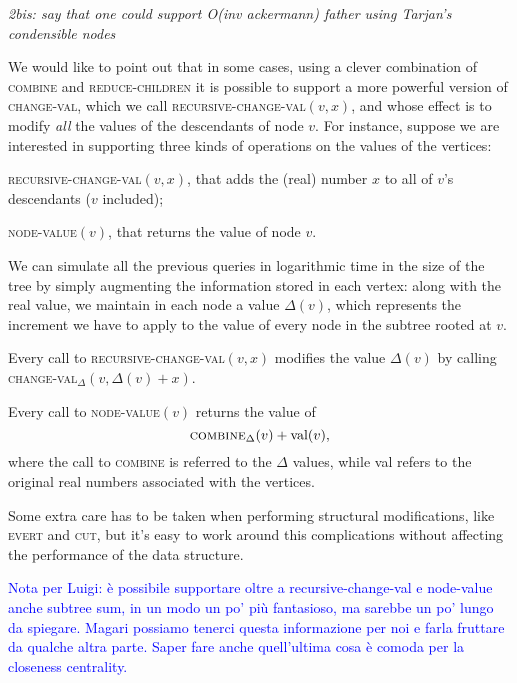 \documentclass[a4paper,USenglish]{lipics}
\begin{document}
			\emph{2bis: say that one could support O(inv ackermann) father using Tarjan's condensible nodes}
			
			We would like to point out that in some cases, using a clever combination of \textsc{combine} and \textsc{reduce-children} it is possible to support a more powerful version of \textsc{change-val}, which we call \textsc{recursive-change-val}$(v,x)$, and whose effect is to modify \emph{all} the values of the descendants of node $v$. For instance, suppose we are interested in supporting three kinds of operations on the values of the vertices:
			\begin{compactitem}
				\item \textsc{recursive-change-val}$(v,x)$, that adds the (real) number $x$ to all of $v$'s descendants ($v$ included);
				\item \textsc{node-value}$(v)$, that returns the value of node $v$.
			\end{compactitem}
We can simulate all the previous queries in logarithmic time in the size of the tree by simply augmenting the information stored in each vertex: along with the real value, we maintain in each node a value $\Delta(v)$, which represents the increment we have to apply to the value of every node in the subtree rooted at $v$.
			\begin{compactitem}
				\item Every call to \textsc{recursive-change-val}$(v, x)$ modifies the value $\Delta(v)$ by calling \textsc{change-val}$_\Delta(v, \Delta(v) + x)$.
				\item Every call to \textsc{node-value}$(v)$ returns the value of $$\textsc{combine}_\Delta(v) + \textrm{val}(v),$$ where the call to \textsc{combine} is referred to the $\Delta$ values, while \textrm{val} refers to the original real numbers associated with the vertices.
			\end{compactitem}
			Some extra care has to be taken when performing structural modifications, like \textsc{evert} and \textsc{cut}, but it's easy to work around this complications without affecting the performance of the data structure.
			
			\textcolor{blue}{Nota per Luigi: è possibile supportare oltre a recursive-change-val e node-value anche subtree sum, in un modo un po' più fantasioso, ma sarebbe un po' lungo da spiegare. Magari possiamo tenerci questa informazione per noi e farla fruttare da qualche altra parte. Saper fare anche quell'ultima cosa è comoda per la closeness centrality.}
			
\end{document}
